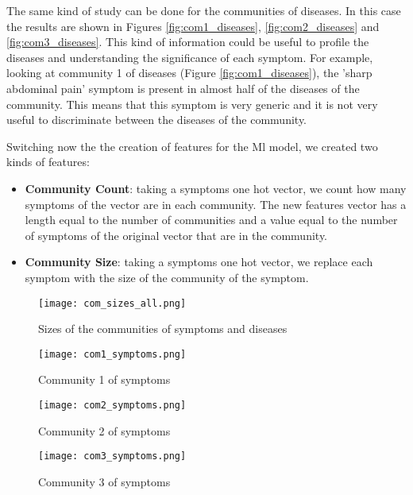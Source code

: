 The same kind of study can be done for the communities of diseases. In this case the results are shown in Figures \ref{fig:com1_diseases}, 
\ref{fig:com2_diseases} and \ref{fig:com3_diseases}. This kind of information could be useful to profile the diseases and understanding the significance
of each symptom. For example, looking at community 1 of diseases (Figure \ref{fig:com1_diseases}), the 'sharp abdominal pain' symptom is present in almost 
half of the diseases of the community. This means that this symptom is very generic and it is not very useful to discriminate between the diseases of the community.

Switching now the the creation of features for the Ml model, we created two kinds of features: 
\begin{itemize}
    \item \textbf{Community Count}: taking a symptoms one hot vector, we count how many symptoms of the vector are in each community. The new features vector 
    has a length equal to the number of communities and a value equal to the number of symptoms of the original vector that are in the community.
    \item \textbf{Community Size}: taking a symptoms one hot vector, we replace each symptom with the size of the community of the symptom.
\end{itemize}



\begin{figure}[H]
    \centering
    \texttt{[image: com\_sizes\_all.png]}
    \caption{Sizes of the communities of symptoms and diseases}
    \label{fig:com_sizes_all}
\end{figure}

\begin{figure}[H]
    \centering
    \texttt{[image: com1\_symptoms.png]}
    \caption{Community 1 of symptoms}
    \label{fig:com1_symptoms}
\end{figure}

\begin{figure}[H]
    \centering
    \texttt{[image: com2\_symptoms.png]}
    \caption{Community 2 of symptoms}
    \label{fig:com2_symptoms}
\end{figure}

\begin{figure}[H]
    \centering
    \texttt{[image: com3\_symptoms.png]}
    \caption{Community 3 of symptoms}
    \label{fig:com3_symptoms}
\end{figure}

